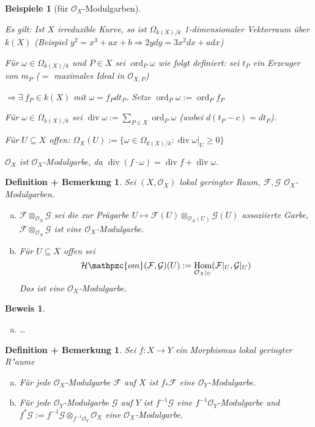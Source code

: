\documentclass[paper = A4, fontsize=12pt, numbers=noendperiod, chapterprefix=true]{scrbook}
\theoremstyle{break}
\newtheorem{DefBem}[Def]{Definition + Bemerkung}
\theoremstyle{nonumberbreak}
\newtheorem{bspe}{Beispiele}
\newtheorem{bew}{Beweis}
\theoremstyle{nonumberplain}
\newcommand{\Sum}{\sum\limits}
\DeclareMathOperator{\Hom}{Hom}
\DeclareMathOperator{\ddiv}{div}
\DeclareMathOperator{\ord}{ord}
\newcommand{\calF}{\mathcal{F}}
\newcommand{\calG}{\mathcal{G}}
\newcommand{\calHom}{\mathcal{H}\mathpzc{om}}
\newcommand{\calO}{\mathcal{O}}
\begin{document}
\begin{bspe}[f\"ur $\calO_X$-Modulgarben]
\begin{enumerate}[1)]
	\emph{Es gilt}: Ist $X$ irreduzible Kurve, so ist $\Omega_{k(X)/k}$ 1-dimensionaler Vektorraum \"uber $k(X)$ (Beispiel $y^2 = x^3 + ax + b \Rightarrow 2ydy = 3x^2dx + adx$)
	
	F\"ur $\omega \in \Omega_{k(X)/k}$ und $P \in X$ sei $\ord_P \omega$ wie folgt definiert: sei $t_P$ ein Erzeuger von $m_P$ ($=$ maximales Ideal in $\calO_{X,P}$)
	
	$\Rightarrow \exists\ f_P \in k(X)$ mit $\omega = f_P dt_P$. Setze $\ord_P \omega := \ord_P f_P$
	
	F\"ur $\omega \in \Omega_{k(X)/k}$ sei $\ddiv \omega := \Sum_{P \in X} \ord_P \omega$ (wobei $d(t_P - c) = dt_P$).
	
	F\"ur $U \subseteq X$ offen: $\Omega_X(U) := \{ \omega \in \Omega_{k(X)/k}: \ddiv \omega|_U \ge 0\}$
	
	$\calO_X$ ist $\calO_X$-Modulgarbe, da $\ddiv(f \cdot \omega) = \ddiv f + \ddiv \omega$.
\end{enumerate}\end{bspe}

\begin{DefBem}
Sei $(X, \calO_X)$ lokal geringter Raum, $\calF, \calG$ $\calO_X$-Modulgarben.
\begin{enumerate}[a)]
\item
	$\calF \otimes_{\calO_X} \calG$ sei die zur Pr\"agarbe $U \mapsto \calF(U) \otimes_{\calO_X(U)} \calG(U)$ assoziierte Garbe, $\calF \otimes_{\calO_X} \calG$ ist eine $\calO_X$-Modulgarbe.
\item
	F\"ur $U \subseteq X$ offen sei
		\[ \calHom(\calF, \calG)(U) := \Hom_{\calO_X|_U} (\calF|_U, \calG|_U) \]
	Das ist eine $\calO_X$-Modulgarbe.
\end{enumerate}\end{DefBem}

\begin{bew}\begin{enumerate}[a)]\item[b)]
\ldots
\end{enumerate}\end{bew}

\begin{DefBem}\label{9.3}
Sei $f: X \to Y$ ein Morphismus lokal geringter R"aume
\begin{enumerate}[a)]
\item\label{9.3a}
	F\"ur jede $\calO_X$-Modulgarbe $\calF$ auf $X$ ist $f_* \calF$ eine $\calO_Y$-Modulgarbe.
\item
	F\"ur jede $\calO_Y$-Modulgarbe $\calG$ auf $Y$ ist $f^{-1} \calG$ eine $f^{-1} \calO_Y$-Modulgarbe und $f^* \calG := f^{-1} \calG \otimes_{f^{-1}\calO_Y} \calO_X$ eine $\calO_X$-Modulgarbe.
\end{enumerate}\end{DefBem}
\end{document}
